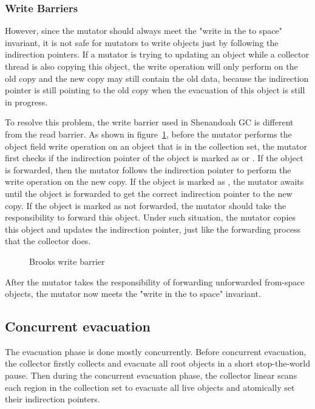 \subsubsection{Write Barriers}

However, since the mutator should always meet the "write in the to space" invariant,
it is not safe for mutators to write objects just by following the indirection pointers.
If a mutator is trying to updating an object while a collector thread is also copying
this object, the write operation will only perform on the old copy and the new copy may still contain the
old data, because the indirection pointer is still pointing to the old copy when
the evacuation of this object is still in progress.

To resolve this problem, the write barrier used in Shenandoah GC is different from the
read barrier. As shown in figure~\ref{fig:brookswritebarrier}, before the mutator
performs the object field write operation on an object that is in the collection set,
the mutator first checks if the indirection pointer of the object is marked as 
or . If the object is forwarded, then the mutator follows
the indirection pointer to perform the write operation on the new copy.
If the object is marked as , the mutator awaits until the object is forwarded to
get the correct indirection pointer to the new copy.
If the object is marked as not forwarded, the mutator should take the responsibility to forward this object.
Under such situation, the mutator copies this object and updates the indirection pointer,
just like the forwarding process that the collector does.

\begin{figure}
  \centering
  
  \caption{Brooks write barrier}
  \label{fig:brookswritebarrier}
\end{figure}

After the mutator takes the responsibility of forwarding unforwarded from-space objects,
the mutator now meets the "write in the to space" invariant. 

\subsection{Concurrent evacuation}

The evacuation phase is done mostly concurrently. Before concurrent evacuation,
the collector firstly collects and evacuate all root objects in a short stop-the-world pause.
Then during the concurrent evacuation phase, the collector linear scans each region in the
collection set to evacuate all live objects and atomically set their indirection
pointers.

